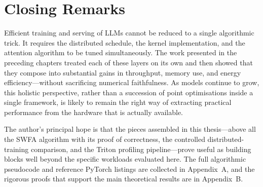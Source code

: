 \section{Closing Remarks}\label{sec:concl_closing}
Efficient training and serving of LLMs cannot be reduced to a
single algorithmic trick. It requires the distributed schedule,
the kernel implementation, and the attention algorithm to be
tuned simultaneously. The work presented in the preceding
chapters treated each of these layers on its own and then showed
that they compose into substantial gains in throughput, memory
use, and energy efficiency---without sacrificing numerical
faithfulness. As models continue to grow, this holistic
perspective, rather than a succession of point optimisations
inside a single framework, is likely to remain the right way of
extracting practical performance from the hardware that is
actually available.

The author's principal hope is that the pieces assembled in this
thesis---above all the SWFA algorithm with its proof of
correctness, the controlled distributed-training comparison, and
the Triton profiling pipeline---prove useful as building blocks
well beyond the specific workloads evaluated here. The full
algorithmic pseudocode and reference PyTorch listings are
collected in Appendix~A, and the rigorous proofs that support
the main theoretical results are in Appendix~B.
